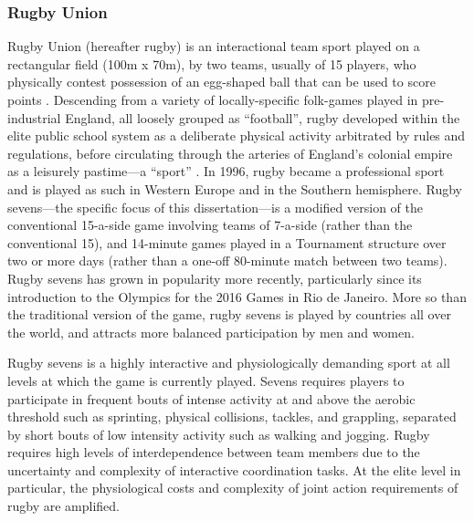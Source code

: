   \subsubsection{Rugby Union}
  Rugby Union (hereafter rugby) is an interactional team sport played on a rectangular field (100m x 70m), by two teams, usually of 15 players, who physically contest possession of an egg-shaped ball that can be used to score points \citep{IRB2014}.  Descending from a variety of locally-specific folk-games played in pre-industrial England, all loosely grouped as ``football'', rugby developed within the elite public school system as a deliberate physical activity arbitrated by rules and regulations, before circulating through the arteries of England's colonial empire as a leisurely pastime—a ``sport'' \citep{Dunning2005}.  In 1996, rugby became a professional sport and is played as such in Western Europe and in the Southern hemisphere. Rugby sevens---the specific focus of this dissertation---is a modified version of the conventional 15-a-side game involving teams of 7-a-side (rather than the conventional 15), and 14-minute games played in a Tournament structure over two or more days (rather than a one-off 80-minute match between two teams).  Rugby sevens has grown in popularity more recently, particularly since its introduction to the Olympics for the 2016 Games in Rio de Janeiro.  More so than the traditional version of the game, rugby sevens is played by countries all over the world, and attracts more balanced participation by men and women.

  Rugby sevens is a highly interactive and physiologically demanding sport at all levels at which the game is currently played. Sevens requires players to participate in frequent bouts of intense activity at and above the aerobic threshold such as sprinting, physical collisions, tackles, and grappling, separated by short bouts of low intensity activity such as walking and jogging. Rugby requires high levels of interdependence between team members due to the uncertainty and complexity of interactive coordination tasks.  At the elite level in particular, the physiological costs and complexity of joint action requirements of rugby are amplified.

